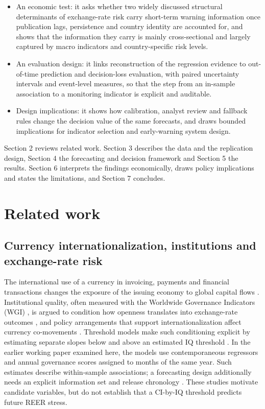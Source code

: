 \documentclass[preprint,12pt,authoryear]{elsarticle}
\begin{document}
\begin{itemize}
\item An economic test: it asks whether two widely discussed structural determinants of exchange-rate risk carry short-term warning information once publication lags, persistence and country identity are accounted for, and shows that the information they carry is mainly cross-sectional and largely captured by macro indicators and country-specific risk levels.
\item An evaluation design: it links reconstruction of the regression evidence to out-of-time prediction and decision-loss evaluation, with paired uncertainty intervals and event-level measures, so that the step from an in-sample association to a monitoring indicator is explicit and auditable.
\item Design implications: it shows how calibration, analyst review and fallback rules change the decision value of the same forecasts, and draws bounded implications for indicator selection and early-warning system design.
\end{itemize}
Section 2 reviews related work. Section 3 describes the data and the replication design, Section 4 the forecasting and decision framework and Section 5 the results. Section 6 interprets the findings economically, draws policy implications and states the limitations, and Section 7 concludes.

\section{Related work}
\subsection{Currency internationalization, institutions and exchange-rate risk}
The international use of a currency in invoicing, payments and financial transactions changes the exposure of the issuing economy to global capital flows \citep{eichengreen2018}. Institutional quality, often measured with the Worldwide Governance Indicators (WGI) \citep{kaufmann2011}, is argued to condition how openness translates into exchange-rate outcomes \citep{chinn2006,aman2024}, and policy arrangements that support internationalization affect currency co-movements \citep{an2024}. Threshold models make such conditioning explicit by estimating separate slopes below and above an estimated IQ threshold \citep{hansen1999,wang2015}. In the earlier working paper examined here, the models use contemporaneous regressors and annual governance scores assigned to months of the same year. Such estimates describe within-sample associations; a forecasting design additionally needs an explicit information set and release chronology \citep{croushore2001}. These studies motivate candidate variables, but do not establish that a CI-by-IQ threshold predicts future REER stress.
\end{document}

